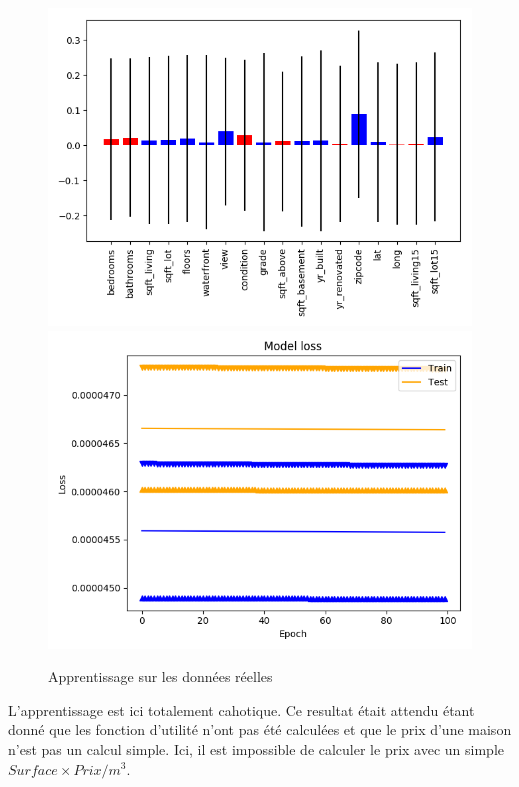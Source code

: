 \begin{figure}[H]
    \center
    \includegraphics[height=\petit]{pict/real/res1.png}
    \includegraphics[height=\petit]{pict/real/learn1.png}
	\caption{Apprentissage sur les données réelles}
	\label{fig:def_100_100}
\end{figure}
L'apprentissage est ici totalement cahotique.
Ce resultat était attendu étant donné que les fonction d'utilité n'ont pas été
calculées et que le prix d'une maison n'est pas un calcul simple.
Ici, il est impossible de calculer le prix avec un simple $Surface \times Prix/m^3$.\\


